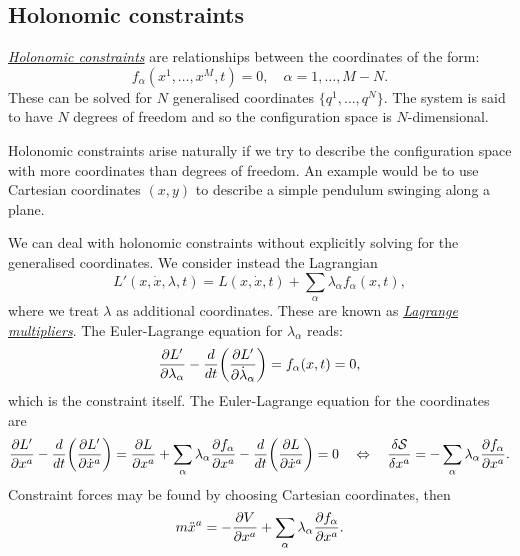 \documentclass{article}
\begin{document}
\subsection{Holonomic constraints}
\href{https://en.wikipedia.org/wiki/Holonomic_constraints}{\textit{Holonomic constraints}} are relationships between the coordinates of the form:
\begin{equation}
    f_\alpha(x^1,\dots,x^M,t) = 0, \quad \alpha = 1,\dots,M-N.
\end{equation}
These can be solved for $N$ generalised coordinates $\{q^1,\dots,q^N \}$. The system is said to have $N$ degrees of freedom and so the configuration space is $N$-dimensional. 
\par
Holonomic constraints arise naturally if we try to describe the configuration space with more coordinates than degrees of freedom. An example would be to use Cartesian coordinates $(x,y)$ to describe a simple pendulum swinging along a plane. 
\par
We can deal with holonomic constraints without explicitly solving for the generalised coordinates. We consider instead the Lagrangian
\begin{equation}
    L'(x, \dot{x}, \lambda, t) = L(x,\dot{x},t) + \sum_\alpha \lambda_\alpha f_\alpha (x,t),
\end{equation}
where we treat $\lambda$ as additional coordinates. These are known as \href{https://en.wikipedia.org/wiki/Lagrange_multiplier}{\textit{Lagrange multipliers}}. The Euler-Lagrange equation for $\lambda_\alpha$ reads:
\begin{equation}
    \pdv{L'}{\lambda_\alpha} - \dv{t} \qty(\pdv{L'}{\dot{\lambda}_\alpha}) = f_\alpha(x,t) = 0,
\end{equation}
which is the constraint itself. The Euler-Lagrange equation for the coordinates are
\begin{equation}
    \pdv{L'}{x^a} - \dv{t}\qty(\pdv{L'}{\dot{x}^a}) = \pdv{L}{x^a} + \sum_\alpha \lambda_\alpha \pdv{f_\alpha}{x^a} - \dv{t}\qty(\pdv{L}{\dot{x}^a}) = 0 \equivalent \fdv{\mathcal{S}}{x^a} = - \sum_\alpha \lambda_\alpha \pdv{f_\alpha}{x^a}.
\end{equation}
Constraint forces may be found by choosing Cartesian coordinates, then
\begin{equation}
    m \ddot{x}^a = - \pdv{V}{x^a} + \sum_\alpha \lambda_\alpha \pdv{f_\alpha}{x^a}.
\end{equation}
\end{document}
